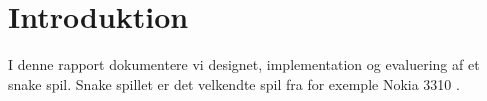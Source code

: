 \section{Introduktion}
I denne rapport dokumentere vi designet, implementation og evaluering af et snake spil. Snake spillet er det velkendte spil fra for exemple Nokia 3310 \cite{wiki_snake}. 